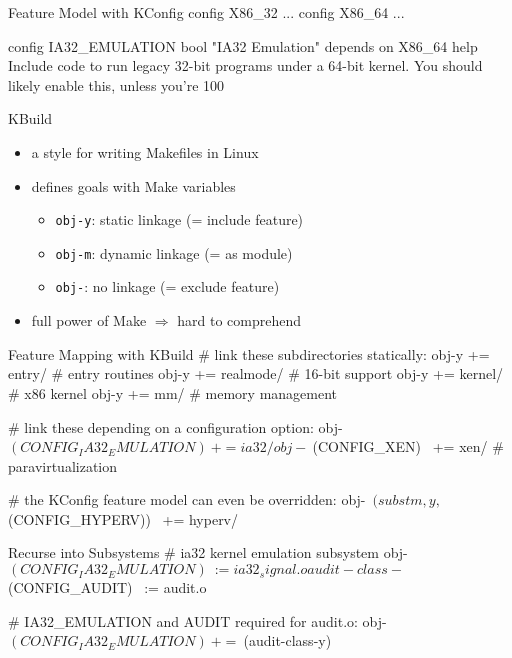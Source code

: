 \begin{frame}[fragile]{\myframetitle}
	\begin{mycolumns}
		\begin{kconfigtight}[basicstyle=\footnotesize]{Feature Model with KConfig}
config X86_32 ...
config X86_64 ...

config IA32_EMULATION
	bool "IA32 Emulation"
	depends on X86_64
	help Include code to run legacy 32-bit programs under a 64-bit kernel. You should likely enable this, unless you're 100%
\end{kconfigtight}
		\begin{definition}{KBuild}
			\begin{itemize}
				\item a style for writing Makefiles in Linux
				\item defines goals with Make variables
				\begin{itemize}
					\item \texttt{obj-y}: static linkage (= include feature)
					\item \texttt{obj-m}: dynamic linkage (= as module)
					\item \texttt{obj-}: no linkage (= exclude feature)
				\end{itemize}
				\item full power of Make $\Rightarrow$ hard to comprehend
			\end{itemize}
		\end{definition}
	\mynextcolumn
		\begin{kbuildtight}[basicstyle=\small]{Feature Mapping with KBuild }
# link these subdirectories statically:
obj-y += entry/ # entry routines
obj-y += realmode/ # 16-bit support
obj-y += kernel/ # x86 kernel
obj-y += mm/ # memory management

# link these depending on a configuration option:
obj-~$(CONFIG_IA32_EMULATION)~ += ia32/
obj-~$(CONFIG_XEN)~ += xen/ # paravirtualization

# the KConfig feature model can even be overridden:
obj-~$(subst m,y,$(CONFIG_HYPERV))~ += hyperv/
		\end{kbuildtight}

		\begin{kbuildtight}[basicstyle=\small]{Recurse into Subsystems}
# ia32 kernel emulation subsystem
obj-~$(CONFIG_IA32_EMULATION)~ := ia32_signal.o
audit-class-~$(CONFIG_AUDIT)~ := audit.o

# IA32_EMULATION and AUDIT required for audit.o:
obj-~$(CONFIG_IA32_EMULATION)~ += ~$(audit-class-y)~
		\end{kbuildtight}
	\end{mycolumns}
\end{frame}

